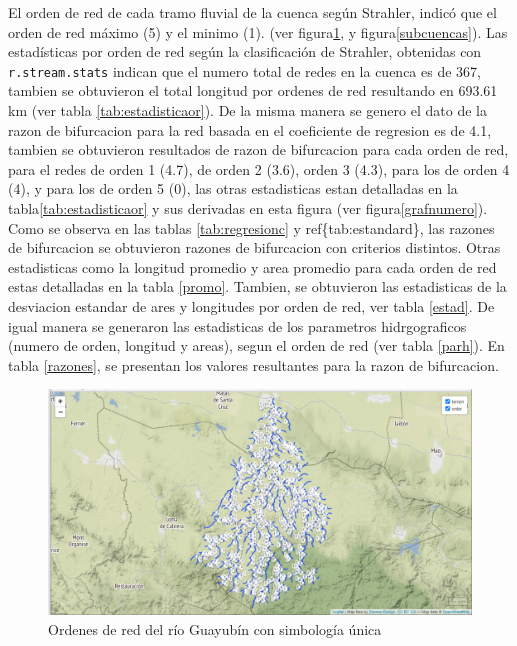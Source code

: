 \documentclass[11pt,]{article}
\begin{document}
El orden de red de cada tramo fluvial de la cuenca según Strahler,
indicó que el orden de red máximo (5) y el minimo (1). (ver
figura\ref{unica}, y figura\ref{subcuencas}). Las estadísticas por orden
de red según la clasificación de Strahler, obtenidas con
\texttt{r.stream.stats} indican que el numero total de redes en la
cuenca es de 367, tambien se obtuvieron el total longitud por ordenes de
red resultando en 693.61 km (ver tabla \ref{tab:estadisticaor}). De la
misma manera se genero el dato de la razon de bifurcacion para la red
basada en el coeficiente de regresion es de 4.1, tambien se obtuvieron
resultados de razon de bifurcacion para cada orden de red, para el redes
de orden 1 (4.7), de orden 2 (3.6), orden 3 (4.3), para los de orden 4
(4), y para los de orden 5 (0), las otras estadisticas estan detalladas
en la tabla\ref{tab:estadisticaor} y sus derivadas en esta figura (ver
figura\ref{grafnumero}). Como se observa en las tablas
\ref{tab:regresionc} y ref\{tab:estandard\}, las razones de bifurcacion
se obtuvieron razones de bifurcacion con criterios distintos. Otras
estadisticas como la longitud promedio y area promedio para cada orden
de red estas detalladas en la tabla \ref{promo}. Tambien, se obtuvieron
las estadisticas de la desviacion estandar de ares y longitudes por
orden de red, ver tabla \ref{estad}. De igual manera se generaron las
estadisticas de los parametros hidrgograficos (numero de orden, longitud
y areas), segun el orden de red (ver tabla \ref{parh}). En tabla
\ref{razones}, se presentan los valores resultantes para la razon de
bifurcacion.

\begin{figure}
\centering
\includegraphics[width=1.00000\textwidth]{ordenes de red.png}
\caption{Ordenes de red del río Guayubín con simbología
única\label{unica}}
\end{figure}
\end{document}
